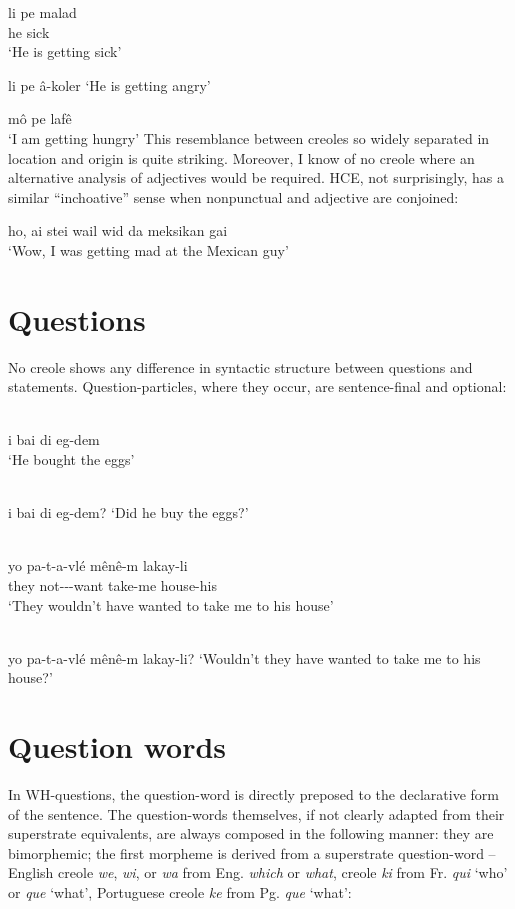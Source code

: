 \ea\label{ex:2:71}
 \gll li pe malad\\
he {\ASP} sick\\
\glt `He is getting sick'
\z

\ea\label{ex:2:72}
 li pe {\^a}-koler
\glt `He is getting angry'
\z

\ea\label{ex:2:73}
 m{\^o} pe laf{\^e}\\
\glt `I am getting hungry'
\z
This resemblance between creoles so widely separated in location and origin is quite striking. Moreover, I know of no creole where an alterna\-tive analysis of adjectives would be required. HCE, not surprisingly, has a similar ``inchoative'' sense when nonpunctual and adjective are conjoined:

\ea\label{ex:2:74}
 ho, ai stei wail wid da meksikan gai\\
\glt `Wow, I was getting mad at the Mexican guy'
\z


\section{Questions}
No creole shows any difference in syntactic structure between questions and statements. Question-particles, where they occur, are sentence-final and optional:

\ea\label{ex:2:75}
 \langinfo{\langGC}{}{}\\
 i bai di eg-dem\\
\glt `He bought the eggs'
\z

\ea\label{ex:2:76}
\langinfo{\langGC}{}{}\\
i bai di eg-dem?
\glt `Did he buy the eggs?'
\z

\ea\label{ex:2:77}
\langinfo{\langHC}{}{}\\
\gll yo pa-t-a-vlé m{\^e}n{\^e}-m lakay-li\\
they not-\TNS-\MOD-want take-me house-his\\
\glt `They wouldn't have wanted to take me to his house'
\z

\ea\label{ex:2:78}
\langinfo{\langHC}{}{}\\
yo pa-t-a-vlé m{\^e}n{\^e}-m lakay-li?
\glt `Wouldn't they have wanted to take me to his house?'
\z
\section{Question words}

In WH-questions, the question-word is directly preposed to the declarative form of the sentence. The question-words themselves, if not clearly adapted from their superstrate equivalents, are always composed in the following manner: they are bimorphemic; the first morpheme is derived from a superstrate question-word -- English creole \textit{we}, \textit{wi}, or \textit{wa} from Eng. \textit{which} or \textit{what},  creole \textit{ki} from Fr. \textit{qui} `who' or \textit{que} `what', Portuguese creole \textit{ke} from Pg. \textit{que} `what':

